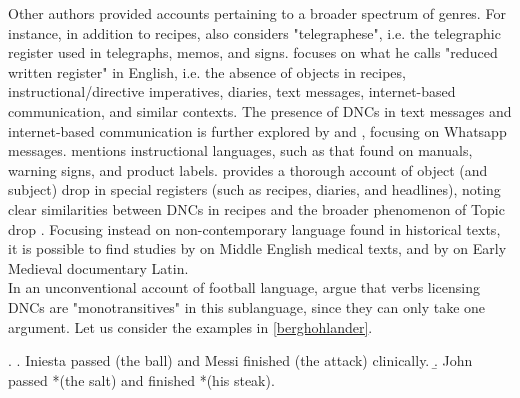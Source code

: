 Other authors provided accounts pertaining to a broader spectrum of genres. For instance, in addition to recipes, \textcite{Cote1996} also considers "telegraphese", i.e. the telegraphic register used in telegraphs, memos, and signs. \textcite{Weir2017} focuses on what he calls "reduced written register" in English, i.e. the absence of objects in recipes, instructional/directive imperatives, diaries, text messages, internet-based communication, and similar contexts. The presence of DNCs in text messages and internet-based communication is further explored by \textcite{StarkMeier2017} and \textcite{Stuntebeck2018}, focusing on Whatsapp messages. \textcite[304]{Liu2008} mentions instructional languages, such as that found on manuals, warning signs, and product labels. \textcite{Paesani2006} provides a thorough account of object (and subject) drop in special registers (such as recipes, diaries, and headlines), noting clear similarities between DNCs in recipes and the broader phenomenon of Topic drop \parencite[165]{Paesani2006}. Focusing instead on non-contemporary language found in historical texts, it is possible to find studies by \textcite{Almeida2009} on Middle English medical texts, and by \textcite{Korkiakangas2018} on Early Medieval documentary Latin.\\
In an unconventional account of football language, \textcite{BerghOhlander2016} argue that verbs licensing DNCs are "monotransitives" \parencite[54]{quirk1985grammar} in this sublanguage, since they can only take one argument. Let us consider the examples in \ref{berghohlander}.

\ex. \label{berghohlander} \a. \label{berghohlander1} Iniesta passed (the ball) and Messi finished (the attack) clinically.
\b. \label{berghohlander2} John passed *(the salt) and finished *(his steak).

